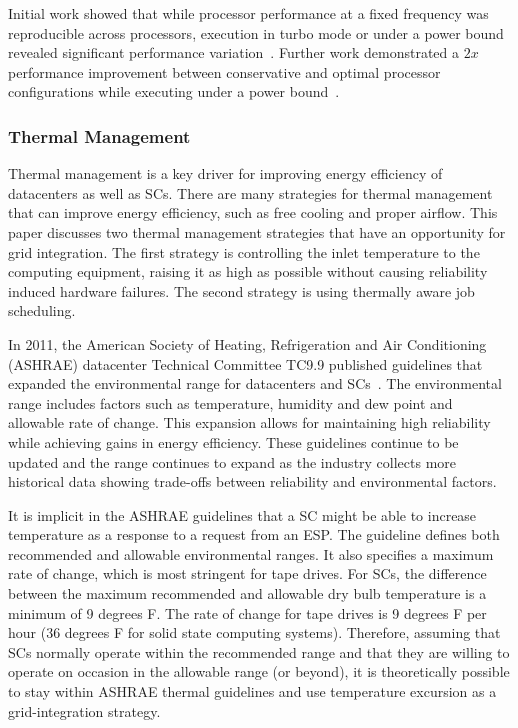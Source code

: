 Initial work showed that while processor performance at a fixed frequency 
was reproducible across processors, execution in turbo mode or under a power
bound revealed significant performance variation~\cite{Rountree2012}. Further
work demonstrated a $2x$ performance improvement between conservative and
optimal processor configurations while executing under a power bound~\cite{Patki1}.

\subsubsection{Thermal Management}

Thermal management is a key driver for improving energy efficiency of datacenters as well as SCs. There are many strategies for thermal
management that can improve energy efficiency, such as free cooling and proper
airflow. This paper discusses two thermal management strategies that have an
opportunity for grid integration. The first strategy is controlling the inlet
temperature to the computing equipment, raising it as high as possible without
causing reliability induced hardware failures. The second strategy is using
thermally aware job scheduling.

In 2011, the American Society of Heating, Refrigeration and Air Conditioning
(ASHRAE) datacenter Technical Committee TC9.9 published guidelines that
expanded the environmental range for datacenters and SCs~\cite{ASHRAE:tgfdpe}. The environmental range includes factors such as temperature, humidity
and dew point and allowable rate of change. This expansion allows for
maintaining high reliability while achieving gains in energy efficiency. These
guidelines continue to be updated and the range continues to expand as the
industry collects more historical data showing trade-offs between reliability
and environmental factors.

It is implicit in the ASHRAE guidelines that a SC might be
able to increase temperature as a response to a request from an ESP. The guideline defines both recommended and
allowable environmental ranges. It also specifies a maximum rate of
change, which is most stringent for tape drives. For SCs, the
difference between the maximum recommended and allowable dry bulb temperature is
a minimum of 9 degrees F. The rate of change for tape drives is 9 degrees F per
hour (36 degrees F for solid state computing systems). Therefore, assuming
that SCs normally operate within the recommended range and
that they are willing to operate on occasion in the allowable range (or beyond),
it is theoretically possible to stay within ASHRAE thermal guidelines and use
temperature excursion as a grid-integration strategy. 

